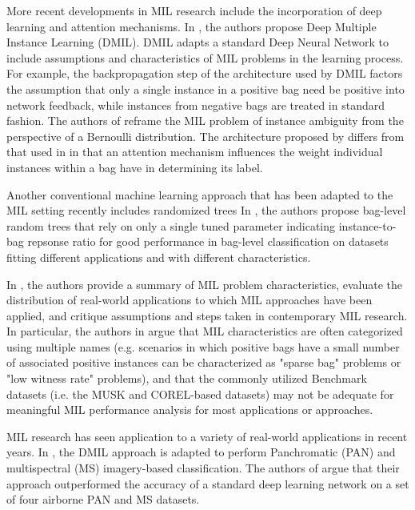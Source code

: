 \documentclass[12pt,dvips]{report}
\numberwithin{equation}{section}
\begin{document}
More recent developments in MIL research include the incorporation of deep learning and attention mechanisms.  In \cite{wu2015deep}, the authors propose Deep Multiple Instance Learning (DMIL).  DMIL adapts a standard Deep Neural Network to include assumptions and characteristics of MIL problems in the learning process.  For example, the backpropagation step of the architecture used by DMIL factors the assumption that only a single instance in a positive bag need be positive into network feedback, while instances from negative bags are treated in standard fashion.  The authors of \cite{ilse2018attention} reframe the MIL problem of instance ambiguity from the perspective of a Bernoulli distribution.  The architecture proposed by \cite{ilse2018attention} differs from that used in \cite{wu2015deep} in that an attention mechanism influences the weight individual instances within a bag have in determining its label.

Another conventional machine learning approach that has been adapted to the MIL setting recently includes randomized trees \cite{komarek2018multiple} In \cite{komarek2018multiple}, the authors propose bag-level random trees that rely on only a single tuned parameter indicating instance-to-bag repsonse ratio for good performance in bag-level classification on datasets fitting different applications and with different characteristics.

In \cite{carbonneau2018multiple}, the authors provide a summary of MIL problem characteristics, evaluate the distribution of real-world applications to which MIL approaches have been applied, and critique assumptions and steps taken in contemporary MIL research.  In particular, the authors in \cite{carbonneau2018multiple} argue that MIL characteristics are often categorized using multiple names (e.g. scenarios in which positive bags have a small number of associated positive instances can be characterized as "sparse bag" problems or "low witness rate" problems), and that the commonly utilized Benchmark datasets (i.e. the MUSK and COREL-based datasets) may not be adequate for meaningful MIL performance analysis for most applications or approaches.

MIL research has seen application to a variety of real-world applications in recent years.  In \cite{liu2018deep}, the DMIL approach is adapted to perform Panchromatic (PAN) and multispectral (MS) imagery-based classification.  The authors of \cite{liu2018deep} argue that their approach outperformed the accuracy of a standard deep learning network on a set of four airborne PAN and MS datasets.  
\end{document}
